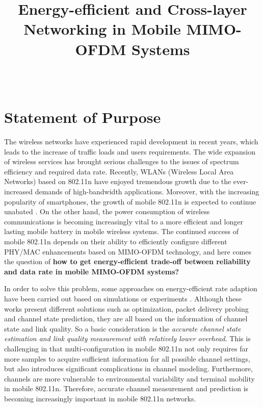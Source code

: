 \documentclass[journal,onecolumn,12pt]{IEEEtran}
\begin{document}
\title{Energy-efficient and Cross-layer Networking in Mobile MIMO-OFDM Systems}

\author{ \\
}

\maketitle
%


\section{Statement of Purpose}

The wireless networks have experienced rapid development in recent years, which leads to the increase of traffic loads and users requirements. The wide expansion of wireless services has brought serious challenges to the issues of spectrum efficiency and required data rate. Recently, WLANs (Wireless Local Area Networks) based on 802.11n have enjoyed tremendous growth due to the ever-increased demands of high-bandwidth applications. Moreover, with the increasing popularity of smartphones, the growth of mobile 802.11n is expected to continue unabated \cite{Bala2010wifi}. On the other hand, the power consumption of wireless communications is becoming increasingly vital to a more efficient and longer lasting mobile battery in mobile wireless systems. The continued success of mobile 802.11n depends on their ability to efficiently configure different PHY/MAC enhancements based on MIMO-OFDM technology, and here comes the question of \textbf{how to get energy-efficient trade-off between reliability and data rate in mobile MIMO-OFDM systems?}

In order to solve this problem, some approaches on energy-efficient rate adaption have been carried out based on simulations \cite{5510775} \cite{6214414} or experiments \cite{Peng:2011:TPS:2030613.2030628} \cite{Li:2012:ERA:2348543.2348585}. Although these works present different solutions such as optimization, packet delivery probing and channel state prediction, they are all based on the information of channel state and link quality. So a basic consideration is the \textit{accurate channel state estimation and link quality measurement with relatively lower overhead}. This is challenging in that multi-configuration in mobile 802.11n not only requires far more samples to acquire sufficient information for all possible channel settings, but also introduces significant complications in channel modeling. Furthermore, channels are more vulnerable to environmental variability and terminal mobility in mobile 802.11n. Therefore, accurate channel measurement and prediction is becoming increasingly important in mobile 802.11n networks.
\end{document}
